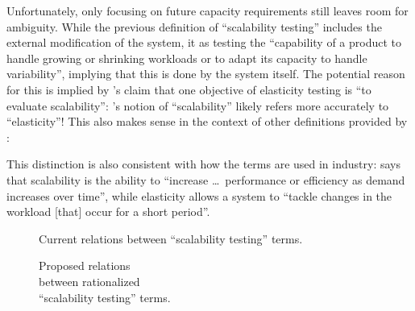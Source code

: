 Unfortunately, only focusing on future capacity requirements still leaves room
for ambiguity. While the previous definition of ``scalability testing'' includes
the external modification of the system, \citet{ISO_IEC2023a}
 it as testing the ``capability of a product to
handle growing or shrinking workloads or to adapt its capacity to handle
variability'', implying that this is done by the system itself. The potential
reason for this is implied by \citet[p.~5-9]{SWEBOK2024}'s claim that one
objective of elasticity testing is ``to evaluate scalability'':
\citep{ISO_IEC2023a}'s notion of ``scalability''
likely refers more accurately to ``elasticity''! This also makes sense in the
context of other definitions provided by \citet{SWEBOK2024}:
This distinction is also consistent with how the terms are used in industry:
\citet{Pandey2023} says that scalability is the ability to
``increase \dots\ performance or efficiency as demand increases over time'',
while elasticity allows a system to ``tackle changes in the workload [that]
occur for a short period''.

\begin{figure}[bt!]
    \centering
    \begin{minipage}{.5\linewidth}
        \centering
        \scalabilityGraphCurrent{}
        \caption{Current relations between ``scalability
            testing'' terms.}
        \label{fig:scal-graph-current}
    \end{minipage}%
    \begin{minipage}{.5\linewidth}
        \centering
        \scalabilityGraphProposed{}
        \caption{Proposed relations\\
            between rationalized\\
            ``scalability testing'' terms.}
        \label{fig:scal-graph-proposed}
    \end{minipage}
\end{figure}

